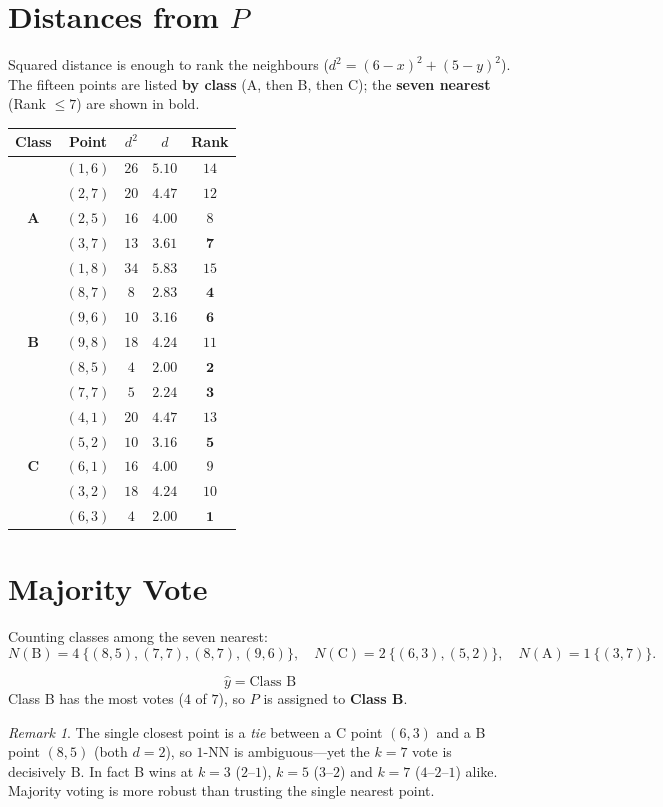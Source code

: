 \documentclass[11pt,a4paper]{report}
\theoremstyle{definition}
\theoremstyle{remark}
\newtheorem*{remark}{Remark}
\begin{document}
	\section{Distances from $P$}
	Squared distance is enough to rank the neighbours ($d^2=(6-x)^2+(5-y)^2$). The
	fifteen points are listed \textbf{by class} (A, then B, then C); the
	\textbf{seven nearest} (Rank $\le 7$) are shown in bold.
	\begin{center}
		\small
		\renewcommand{\arraystretch}{1.15}
		\begin{tabular}{c c c c c}
			\toprule
			Class & Point & $d^2$ & $d$ & Rank\\
			\midrule
			\multirow{5}{*}{\textbf{A}}
			& $(1,6)$ & $26$ & $5.10$          & $14$\\
			& $(2,7)$ & $20$ & $4.47$          & $12$\\
			& $(2,5)$ & $16$ & $4.00$          & $8$\\
			& $(3,7)$ & $13$ & $\mathbf{3.61}$ & $\mathbf{7}$\\
			& $(1,8)$ & $34$ & $5.83$          & $15$\\
			\midrule
			\multirow{5}{*}{\textbf{B}}
			& $(8,7)$ & $8$  & $\mathbf{2.83}$ & $\mathbf{4}$\\
			& $(9,6)$ & $10$ & $\mathbf{3.16}$ & $\mathbf{6}$\\
			& $(9,8)$ & $18$ & $4.24$          & $11$\\
			& $(8,5)$ & $4$  & $\mathbf{2.00}$ & $\mathbf{2}$\\
			& $(7,7)$ & $5$  & $\mathbf{2.24}$ & $\mathbf{3}$\\
			\midrule
			\multirow{5}{*}{\textbf{C}}
			& $(4,1)$ & $20$ & $4.47$          & $13$\\
			& $(5,2)$ & $10$ & $\mathbf{3.16}$ & $\mathbf{5}$\\
			& $(6,1)$ & $16$ & $4.00$          & $9$\\
			& $(3,2)$ & $18$ & $4.24$          & $10$\\
			& $(6,3)$ & $4$  & $\mathbf{2.00}$ & $\mathbf{1}$\\
			\bottomrule
		\end{tabular}
	\end{center}
	
	\section{Majority Vote}
	Counting classes among the seven nearest:
	\[
	N(\text{B})=4\ \{(8,5),(7,7),(8,7),(9,6)\},\quad
	N(\text{C})=2\ \{(6,3),(5,2)\},\quad
	N(\text{A})=1\ \{(3,7)\}.
	\]
	\begin{resultbox}
		\[ \boxed{\hat y=\text{Class B}} \]
		Class B has the most votes ($4$ of $7$), so $P$ is assigned to \textbf{Class B}.
	\end{resultbox}
	\begin{remark}
		The single closest point is a \emph{tie} between a C point $(6,3)$ and a B point
		$(8,5)$ (both $d=2$), so $1$-NN is ambiguous---yet the $k=7$ vote is decisively
		B. In fact B wins at $k=3$ ($2$--$1$), $k=5$ ($3$--$2$) and $k=7$ ($4$--$2$--$1$)
		alike. Majority voting is more robust than trusting the single nearest point.
	\end{remark}
	
\end{document}
